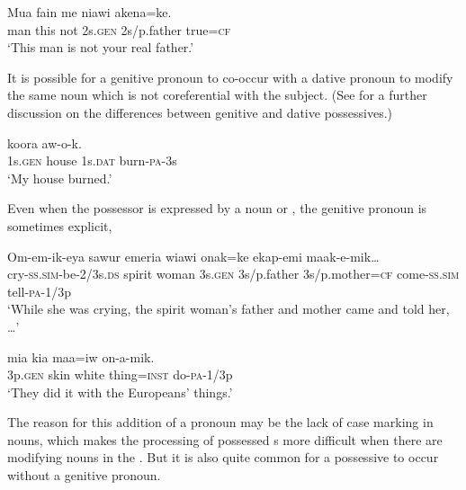 \ea%
\label{ex:3:x569}
\gll Mua fain me  niawi akena=ke. \\
man this not 2s.\textsc{gen} 2s/p.father true=\textsc{cf}\\
\glt`This man is not your real father.'
\z

It is possible for a genitive pronoun to co-occur with a dative pronoun to modify the same noun which is not coreferential with the subject. (See  for a further discussion on the differences between genitive and dative possessives.)

\ea%
\label{ex:3:x570}
\gll {} koora  aw-o-k. \\
1s.\textsc{gen} house 1s.\textsc{dat} burn-\textsc{pa}-3s\\
\glt`My house burned.'
\z

Even when the possessor is expressed by a noun or , the genitive pronoun is sometimes explicit,  \textstyleParagraphContinuationChar{ (} 

\ea%
\label{ex:3:x573}
\gll Om-em-ik-eya sawur emeria  wiawi onak=ke ekap-emi maak-e-mik{\dots}
\\
cry-\textsc{ss}.\textsc{sim}-be-2/3s.\textsc{ds} spirit woman 3s.\textsc{gen} 3s/p.father 3s/p.mother=\textsc{cf} come-\textsc{ss}.\textsc{sim} tell-\textsc{pa}-1/3p\\
\glt`While she was crying, the spirit woman's father and mother came and told her, {\dots}'
\z

\ea%
\label{ex:3:x574}
\gll {} mia kia maa=iw on-a-mik. \\
3p.\textsc{gen} skin white thing=\textsc{inst} do-\textsc{pa}-1/3p\\
\glt`They did it with the Europeans' things.'
\z

The reason for this addition of a pronoun may be the lack of case marking in nouns, which makes the processing of possessed s more difficult when there are modifying nouns in the . But it is also quite common for a possessive  to occur without a genitive pronoun. 

